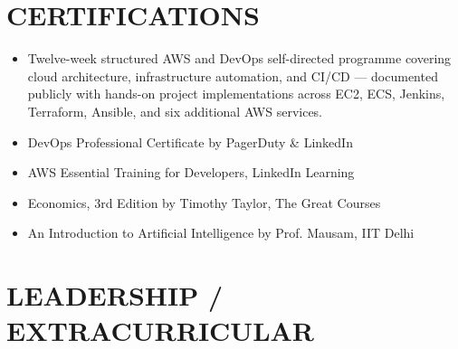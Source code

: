 \documentclass[letterpaper,11pt]{article}
\begin{document}
\section{CERTIFICATIONS}


\begin{itemize}[itemsep=1pt, parsep=1pt, before=\vspace{1pt}]
    \item Twelve-week structured AWS and DevOps self-directed programme covering cloud architecture, infrastructure automation, and CI/CD — documented publicly with hands-on project implementations across EC2, ECS, Jenkins, Terraform, Ansible, and six additional AWS services.
    \item DevOps Professional Certificate by PagerDuty \& LinkedIn
    \item AWS Essential Training for Developers, LinkedIn Learning
    \item Economics, 3rd Edition by Timothy Taylor, The Great Courses
    \item An Introduction to Artificial Intelligence by Prof. Mausam, IIT Delhi
\end{itemize}


\section{LEADERSHIP / EXTRACURRICULAR}
\end{document}
